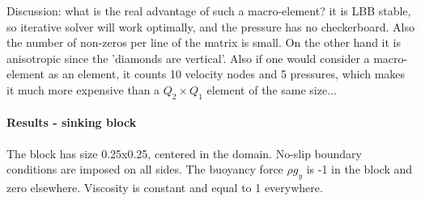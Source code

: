 Discussion: what is the real advantage of such a macro-element? it is LBB stable, so 
iterative solver will work optimally, and the pressure has no checkerboard. 
Also the number of non-zeros per line of the matrix is small.  
On the other hand it is anisotropic since the 'diamonds are vertical'. 
Also if one would consider a macro-element as an element, it counts 10 velocity nodes and 5 pressures, 
which makes it much more expensive than a $Q_2\times Q_1$ element of the same size...

\paragraph{Results - sinking block}

The block has size 0.25x0.25, centered in the domain. No-slip boundary conditions are imposed on all 
sides. The buoyancy force $\rho g_y$ is -1 in the block and zero elsewhere. Viscosity is constant and 
equal to 1 everywhere. 

